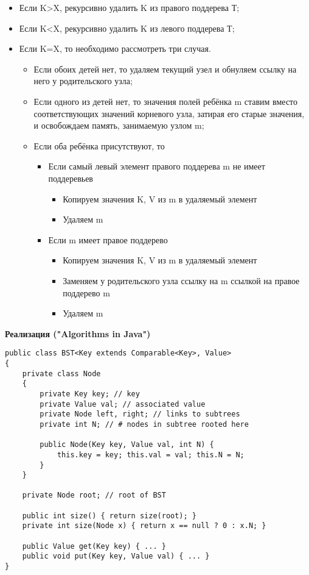\begin{itemize}
\item[\labelitemi] Если K>X, рекурсивно удалить K из правого поддерева Т;
\item[\labelitemi] Если K<X, рекурсивно удалить K из левого поддерева Т;
\item[\labelitemi] Если K=X, то необходимо рассмотреть три случая.
\begin{itemize}
\item[\labelitemi] Если обоих детей нет, то удаляем текущий узел и обнуляем ссылку на него у родительского узла;
\item[\labelitemi] Если одного из детей нет, то значения полей ребёнка m ставим вместо соответствующих значений корневого узла, затирая его старые значения, и освобождаем память, занимаемую узлом m;
\item[\labelitemi] Если оба ребёнка присутствуют, то
\begin{itemize}
\item[\labelitemi] Если самый левый элемент правого поддерева m не имеет поддеревьев
\begin{itemize}
\item[\labelitemi] Копируем значения K, V из m в удаляемый элемент
\item[\labelitemi] Удаляем m
\end{itemize}
\item[\labelitemi] Если m имеет правое поддерево
\begin{itemize}
\item[\labelitemi] Копируем значения K, V из m в удаляемый элемент
\item[\labelitemi] Заменяем у родительского узла ссылку на m ссылкой на правое поддерево m
\item[\labelitemi] Удаляем m
\end{itemize}
\end{itemize}
\end{itemize}
\end{itemize}

{\bf Реализация ("Algorithms in Java")}\\
\begin{verbatim}
public class BST<Key extends Comparable<Key>, Value>
{
    private class Node
    {
        private Key key; // key
        private Value val; // associated value
        private Node left, right; // links to subtrees
        private int N; // # nodes in subtree rooted here
        
        public Node(Key key, Value val, int N) {
            this.key = key; this.val = val; this.N = N;
        }
    }
    
    private Node root; // root of BST
    
    public int size() { return size(root); }
    private int size(Node x) { return x == null ? 0 : x.N; }
    
    public Value get(Key key) { ... }
    public void put(Key key, Value val) { ... }
}
\end{verbatim}

